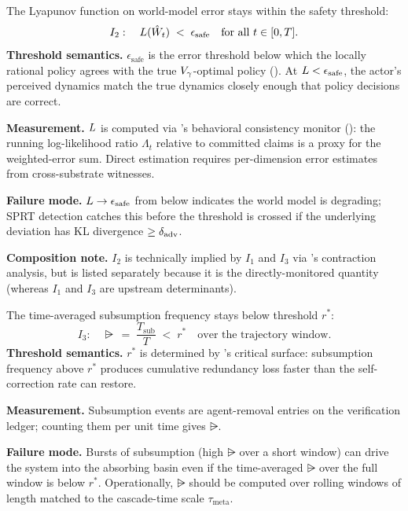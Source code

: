 \begin{definition}
\label{inv:I2}
The Lyapunov function on world-model error stays within the safety
threshold:
\[
  I_2: \quad L(\hat{W}_t) \;<\; \epsilon_{\mathrm{safe}}
  \quad \text{for all } t \in [0, T].
\]
\textbf{Threshold semantics.} $\epsilon_{\mathrm{safe}}$ is the error threshold
    below which the locally rational policy agrees with the true
    $V_{\gamma}$-optimal policy (\citep[Section on policy
    correctness]{lasser2026phase}). At $L < \epsilon_{\mathrm{safe}}$, the
    actor's perceived dynamics match the true dynamics closely enough that
    policy decisions are correct.

\textbf{Measurement.} $L$ is computed via
    \citep[Exogenous~Verification]{lasser2026exo}'s behavioral consistency
    monitor (\citep[Definition of Behavioral Consistency
    Monitor]{lasser2026exo}): the running log-likelihood ratio $\Lambda_t$
    relative to committed claims is a proxy for the weighted-error sum. Direct
    estimation requires per-dimension error estimates from cross-substrate
    witnesses.

\textbf{Failure mode.} $L \to \epsilon_{\mathrm{safe}}$ from below
    indicates the world model is degrading; SPRT detection catches this before
    the threshold is crossed if the underlying deviation has KL divergence
    $\geq \delta_{\mathrm{adv}}$.

\textbf{Composition note.} $I_2$ is technically implied by $I_1$ and $I_3$ via
    \citep[Phase~Redundancy]{lasser2026phase}'s contraction analysis, but is
    listed separately because it is the directly-monitored quantity (whereas
    $I_1$ and $I_3$ are upstream determinants).
\end{definition}

\begin{definition}
\label{inv:I3}
The time-averaged subsumption frequency stays below threshold $r^*$:
\[
  I_3: \quad \rsub \;=\; \frac{T_{\mathrm{sub}}}{T} \;<\; r^*
  \quad \text{over the trajectory window.}
\]
\textbf{Threshold semantics.} $r^*$ is determined by
    \citep[Phase~Redundancy]{lasser2026phase}'s critical surface: subsumption
    frequency above $r^*$ produces cumulative redundancy loss faster than the
    self-correction rate can restore.

\textbf{Measurement.} Subsumption events are agent-removal entries on the
    verification ledger; counting them per unit time gives $\rsub$.

\textbf{Failure mode.} Bursts of subsumption (high $\rsub$ over a short window)
    can drive the system into the absorbing basin even if the time-averaged
    $\rsub$ over the full window is below $r^*$. Operationally, $\rsub$ should
    be computed over rolling windows of length matched to the cascade-time
    scale $\tau_{\mathrm{meta}}$.
\end{definition}

